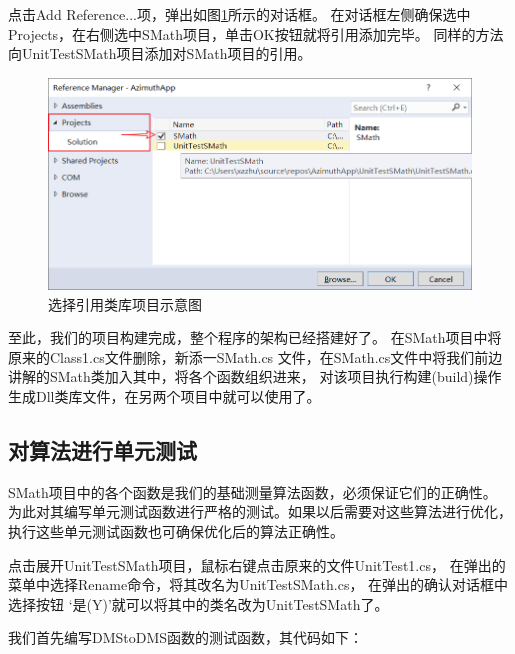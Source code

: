 点击Add Reference...项，弹出如图\ref{fig:AzimuthApp5}所示的对话框。
在对话框左侧确保选中Projects，在右侧选中SMath项目，单击OK按钮就将引用添加完毕。
同样的方法向UnitTestSMath项目添加对SMath项目的引用。
\begin{figure}[htbp]
	\centering
	\includegraphics[scale=0.7]{surveybase/AzimuthApp5.png}
	\caption{选择引用类库项目示意图}
	\label{fig:AzimuthApp5}
\end{figure}

至此，我们的项目构建完成，整个程序的架构已经搭建好了。
在SMath项目中将原来的Class1.cs文件删除，新添一SMath.cs
文件，在SMath.cs文件中将我们前边讲解的SMath类加入其中，将各个函数组织进来，
对该项目执行构建(build)操作生成Dll类库文件，在另两个项目中就可以使用了。

\subsection{对算法进行单元测试}

SMath项目中的各个函数是我们的基础测量算法函数，必须保证它们的正确性。
为此对其编写单元测试函数进行严格的测试。如果以后需要对这些算法进行优化，
执行这些单元测试函数也可确保优化后的算法正确性。

点击展开UnitTestSMath项目，鼠标右键点击原来的文件UnitTest1.cs，
在弹出的菜单中选择Rename命令，将其改名为UnitTestSMath.cs，
在弹出的确认对话框中选择按钮 `是(Y)'就可以将其中的类名改为UnitTestSMath了。

我们首先编写DMStoDMS函数的测试函数，其代码如下：

